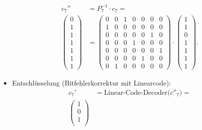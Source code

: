\begin{itemize}
\begin{align*}
            c_{7}''&=P_7^{-1}\cdot c_7=\\
            \begin{pmatrix} %
                0\\
                1\\
                1\\
                1\\
                1\\
                1\\
                1
            \end{pmatrix}
            &=
            \begin{pmatrix} %
                0 & 0 & 1 & 0 & 0 & 0 & 0\\
                1 & 0 & 0 & 0 & 0 & 0 & 0\\
                0 & 0 & 0 & 0 & 0 & 1 & 0\\
                0 & 0 & 0 & 1 & 0 & 0 & 0\\
                0 & 0 & 0 & 0 & 0 & 0 & 1\\
                0 & 0 & 0 & 0 & 1 & 0 & 0\\
                0 & 1 & 0 & 0 & 0 & 0 & 0
            \end{pmatrix}
            \cdot
            \begin{pmatrix} %
                1\\
                1\\
                0\\
                1\\
                1\\
                1\\
                1
            \end{pmatrix}
            .
        \end{align*}
    \item Entschlüsselung (Bitfehlerkorrektur mit Linearcode):
        \begin{align*}
            c_{7}'&=\text{Linear-Code-Decoder($c''_7$)}=\\
            \begin{pmatrix} %
                1\\
                0\\
                1\\

\end{pmatrix}
\end{align*}
\end{itemize}
